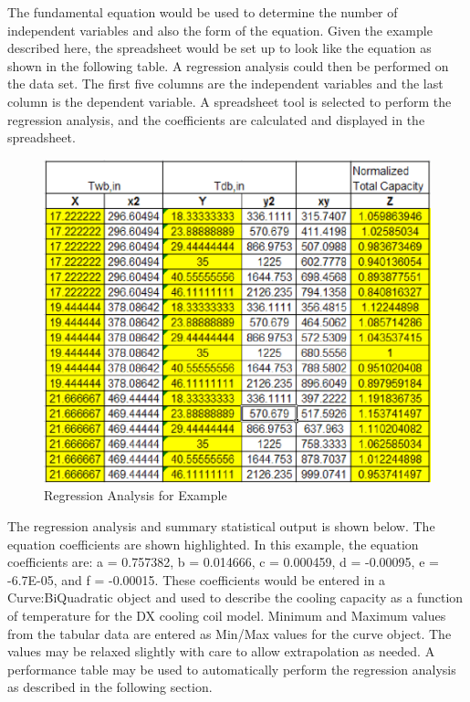 The fundamental equation would be used to determine the number of independent variables and also the form of the equation. Given the example described here, the spreadsheet would be set up to look like the equation as shown in the following table. A regression analysis could then be performed on the data set. The first five columns are the independent variables and the last column is the dependent variable. A spreadsheet tool is selected to perform the regression analysis, and the coefficients are calculated and displayed in the spreadsheet.

\begin{figure}[htbp]
\centering
\includegraphics{media/image7866.png}
\caption{Regression Analysis for Example \protect \label{fig:dx-cooling-data-normalized}}
\end{figure}

The regression analysis and summary statistical output is shown below. The equation coefficients are shown highlighted. In this example, the equation coefficients are: a = 0.757382, b = 0.014666, c = 0.000459, d = -0.00095, e = -6.7E-05, and f = -0.00015. These coefficients would be entered in a Curve:BiQuadratic object and used to describe the cooling capacity as a function of temperature for the DX cooling coil model. Minimum and Maximum values from the tabular data are entered as Min/Max values for the curve object. The values may be relaxed slightly with care to allow extrapolation as needed. A performance table may be used to automatically perform the regression analysis as described in the following section.

